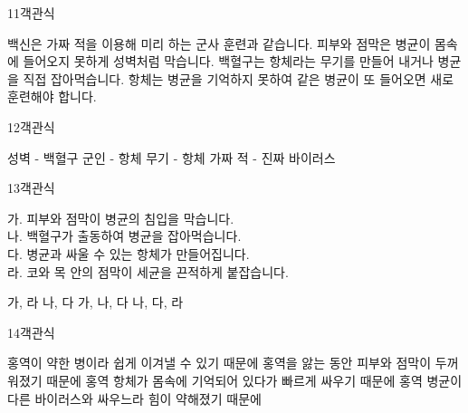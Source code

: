 \documentclass[fs95,seriesFre]{korfarm-base}
\begin{document}
\begin{kfQBlock}{11}{객관식}
\begin{kfChoices}
\kfChoice 백신은 가짜 적을 이용해 미리 하는 군사 훈련과 같습니다.
\kfChoice 피부와 점막은 병균이 몸속에 들어오지 못하게 성벽처럼 막습니다.
\kfChoice 백혈구는 항체라는 무기를 만들어 내거나 병균을 직접 잡아먹습니다.
\kfChoice 항체는 병균을 기억하지 못하여 같은 병균이 또 들어오면 새로 훈련해야 합니다.
\end{kfChoices}
\end{kfQBlock}

\begin{kfQBlock}{12}{객관식}
\begin{kfChoices}
\kfChoice 성벽 - 백혈구
\kfChoice 군인 - 항체
\kfChoice 무기 - 항체
\kfChoice 가짜 적 - 진짜 바이러스
\end{kfChoices}
\end{kfQBlock}

\begin{kfQBlock}{13}{객관식}
\begin{kfEvidence}가. 피부와 점막이 병균의 침입을 막습니다. \\\relax
나. 백혈구가 출동하여 병균을 잡아먹습니다. \\\relax
다. 병균과 싸울 수 있는 항체가 만들어집니다. \\\relax
라. 코와 목 안의 점막이 세균을 끈적하게 붙잡습니다.\end{kfEvidence}
\begin{kfChoices}
\kfChoice 가, 라
\kfChoice 나, 다
\kfChoice 가, 나, 다
\kfChoice 나, 다, 라
\end{kfChoices}
\end{kfQBlock}

\begin{kfQBlock}{14}{객관식}
\begin{kfChoices}
\kfChoice 홍역이 약한 병이라 쉽게 이겨낼 수 있기 때문에
\kfChoice 홍역을 앓는 동안 피부와 점막이 두꺼워졌기 때문에
\kfChoice 홍역 항체가 몸속에 기억되어 있다가 빠르게 싸우기 때문에
\kfChoice 홍역 병균이 다른 바이러스와 싸우느라 힘이 약해졌기 때문에
\end{kfChoices}
\end{kfQBlock}
\end{document}
